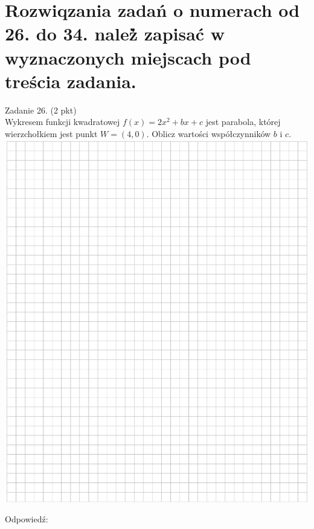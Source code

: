 \documentclass[10pt]{article}
\begin{document}
\section*{Rozwiqzania zadań o numerach od 26. do 34. należ̀ zapisać w wyznaczonych miejscach pod treścia zadania.}
Zadanie 26. (2 pkt)\\
Wykresem funkcji kwadratowej \(f(x)=2 x^{2}+b x+c\) jest parabola, której wierzchołkiem jest punkt \(W=(4,0)\). Oblicz wartości współczynników \(b\) i \(c\).\\
\includegraphics[max width=\textwidth, center]{2024_11_21_0c267759828927e3a26dg-10}

Odpowiedź:
\end{document}
